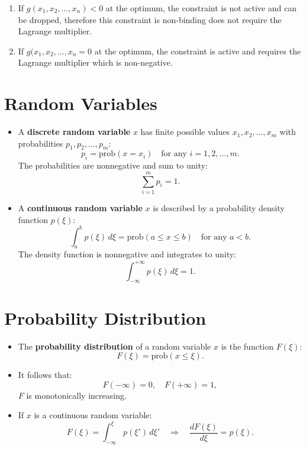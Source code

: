 \begin{itemize}
\begin{itemize}[label=\textbullet]
\begin{itemize}
            \begin{enumerate}
                \item If $g(x_1, x_2, \ldots, x_n) < 0$ at the optimum, the constraint is not active and can be dropped, therefore this constraint is non-binding does not require the Lagrange multiplier.
                \item If $g(x_1, x_2, \ldots, x_n = 0$ at the optimum, the constraint is active and requires the Lagrange multiplier which is non-negative.
            \end{enumerate}
        \end{itemize}
    \end{itemize}
\end{itemize}

\section{Random Variables}

\begin{itemize}[label=\textbullet]
    \item A \textbf{discrete random variable} \( x \) has finite possible values \( x_1, x_2, \ldots, x_m \) with probabilities \( p_1, p_2, \ldots, p_m \):
    \[
    p_i = \text{prob}(x = x_i) \quad \text{for any } i = 1, 2, \ldots, m.
    \]
    The probabilities are nonnegative and sum to unity:
    \[
    \sum_{i=1}^m p_i = 1.
    \]
    \item A \textbf{continuous random variable} \( x \) is described by a probability density function \( p(\xi) \):
    \[
    \int_a^b p(\xi) \, d\xi = \text{prob}(a \leq x \leq b) \quad \text{for any } a < b.
    \]
    The density function is nonnegative and integrates to unity:
    \[
    \int_{-\infty}^{+\infty} p(\xi) \, d\xi = 1.
    \]
\end{itemize}

\section{Probability Distribution}

\begin{itemize}[label=\textbullet]
    \item The \textbf{probability distribution} of a random variable \( x \) is the function \( F(\xi) \):
    \[
    F(\xi) = \text{prob}(x \leq \xi).
    \]
    \item It follows that:
    \[
    F(-\infty) = 0, \quad F(+\infty) = 1,
    \]
    \( F \) is monotonically increasing.
    \item If \( x \) is a continuous random variable:
    \[
    F(\xi) = \int_{-\infty}^{\xi} p(\xi') \, d\xi' \quad \Rightarrow \quad \frac{dF(\xi)}{d\xi} = p(\xi).
    \]
\end{itemize}


